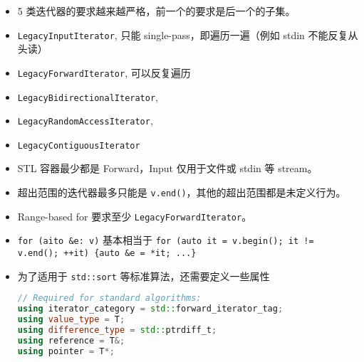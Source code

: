 
\begin{itemize}
\item 5 类迭代器的要求越来越严格，前一个的要求是后一个的子集。
\item \verb`LegacyInputIterator`, 只能 single-pass，即遍历一遍（例如 stdin 不能反复从头读）
\item \verb`LegacyForwardIterator`, 可以反复遍历
\item \verb`LegacyBidirectionalIterator`,
\item \verb`LegacyRandomAccessIterator`,
\item \verb`LegacyContiguousIterator`
\item STL 容器最少都是 Forward，Input 仅用于文件或 stdin 等 stream。
\item 超出范围的迭代器最多只能是 \verb`v.end()`，其他的超出范围都是未定义行为。
\item Range-based for 要求至少 \verb`LegacyForwardIterator`。
\item \verb`for (aito &e: v)` 基本相当于 \verb`for (auto it = v.begin(); it != v.end(); ++it) {auto &e = *it; ...}`
\item 为了适用于 \verb`std::sort` 等标准算法，还需要定义一些属性
\begin{lstlisting}[language=cpp]
// Required for standard algorithms:
using iterator_category = std::forward_iterator_tag;
using value_type = T;
using difference_type = std::ptrdiff_t;
using reference = T&;
using pointer = T*;
\end{lstlisting}
\end{itemize}
